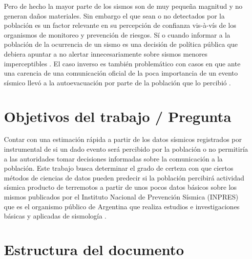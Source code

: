 \documentclass[a4paper]{report}
\begin{document}
Pero de hecho la mayor parte de los sismos son de muy pequeña magnitud y no generan daños materiales.
Sin embargo el que sean o no detectados por la población es un factor relevante en su percepción de confianza vis-à-vís de los organismos de monitoreo y prevención de riesgos.
Sí o cuando informar a la población de la ocurrencia de un sismo es una decisión de política pública que debiera apuntar a no alertar  innecesariamente sobre sismos menores imperceptibles \cite{saunders_j_k_twist_nodate}.
El caso inverso es también problemático con casos en que ante una carencia de una comunicación oficial de la poca importancia de un evento sísmico llevó a la autoevacuación por parte de la población que lo percibió \cite{vaiciulyte_population_2022}. 


\section{Objetivos del trabajo / Pregunta}
Contar con una estimación rápida a partir de los datos sísmicos registrados por instrumental de si un dado evento será percibido por la población o no permitiría a las autoridades tomar decisiones informadas sobre la comunicación a la población.
Este trabajo busca determinar el grado de certeza con que ciertos métodos de ciencias de datos pueden predecir si la población percibirá actividad sísmica producto de terremotos a partir de unos pocos datos básicos sobre los mismos publicados por el Instituto Nacional de Prevención Sísmica (INPRES) que es el organismo público de Argentina que realiza estudios e investigaciones básicas y aplicadas de sismología \cite{noauthor_instituto_2022}.



\section{Estructura del documento}
\end{document}
